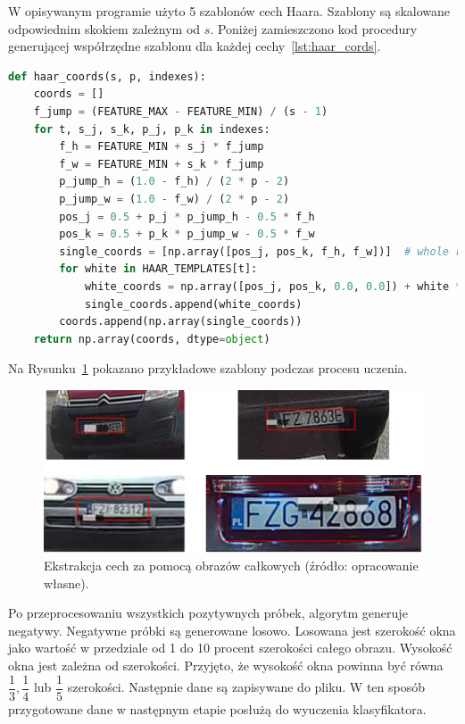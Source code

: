 W opisywanym programie użyto 5 szablonów cech Haara.
Szablony są skalowane odpowiednim skokiem zależnym od $s$.
Poniżej zamieszczono kod procedury generującej współrzędne szablonu dla każdej cechy~\ref{lst:haar_cords}.
\begin{lstlisting}[language=Python, caption=Procedura generujące szablony cech Haara dla konkretnych wpsółrzędnych., label={lst:haar_cords}]
def haar_coords(s, p, indexes):
    coords = []
    f_jump = (FEATURE_MAX - FEATURE_MIN) / (s - 1)
    for t, s_j, s_k, p_j, p_k in indexes:
        f_h = FEATURE_MIN + s_j * f_jump
        f_w = FEATURE_MIN + s_k * f_jump
        p_jump_h = (1.0 - f_h) / (2 * p - 2)
        p_jump_w = (1.0 - f_w) / (2 * p - 2)
        pos_j = 0.5 + p_j * p_jump_h - 0.5 * f_h
        pos_k = 0.5 + p_k * p_jump_w - 0.5 * f_w
        single_coords = [np.array([pos_j, pos_k, f_h, f_w])]  # whole rectangle for single feature
        for white in HAAR_TEMPLATES[t]:
            white_coords = np.array([pos_j, pos_k, 0.0, 0.0]) + white * np.array([f_h, f_w, f_h, f_w])
            single_coords.append(white_coords)
        coords.append(np.array(single_coords))
    return np.array(coords, dtype=object)
\end{lstlisting}
Na Rysunku~\ref{fig:haar_feats_examples} pokazano przykładowe szablony podczas procesu uczenia.
\begin{figure}[!ht]
    \centering
    \includegraphics[scale=0.6]{Pictures/haar_tepmplates}
    \caption{Ekstrakcja cech za pomocą obrazów całkowych (źródło: opracowanie własne).}
    \label{fig:haar_feats_examples}
\end{figure}
\FloatBarrier

Po przeprocesowaniu wszystkich pozytywnych próbek, algorytm generuje negatywy.
Negatywne próbki są generowane losowo.
Losowana jest szerokość okna jako wartość w przedziale od 1 do 10 procent szerokości całego obrazu.
Wysokość okna jest zależna od szerokości.
Przyjęto, że wysokość okna powinna być równa $\dfrac{1}{3}, \dfrac{1}{4}$ lub $\dfrac{1}{5}$ szerokości.
Następnie dane są zapisywane do pliku.
W ten sposób przygotowane dane w następnym etapie posłużą do wyuczenia klasyfikatora.

